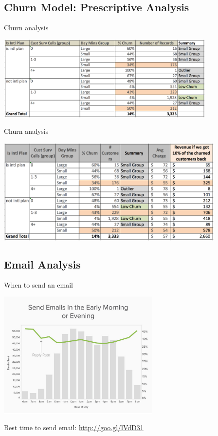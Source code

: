 \documentclass[10pt]{beamer}
\begin{document}
  \subsection{Churn Model: Prescriptive Analysis}

    \begin{frame}{Churn analysis}
      \begin{center}
        \includegraphics[height=120pt]{../graphs/churn_analysis}
      \end{center}
    \end{frame}

    \begin{frame}{Churn analysis}
      \begin{center}
        \includegraphics[height=150pt]{../graphs/churn_analysis_revenue}
      \end{center}
    \end{frame}

  \subsection{Email Analysis}

    \begin{frame}{When to send an email}
      \begin{center}
        \includegraphics[height=180pt]{../graphs/email_analysis_sent_hour}
      \end{center}    
      {\footnotesize Best time to send email: \url{http://goo.gl/lVdD31}}
    \end{frame}
\end{document}
